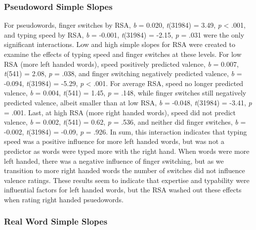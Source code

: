 \documentclass[english,man]{apa6}
\theoremstyle{definition}
\theoremstyle{definition}
\theoremstyle{definition}
\theoremstyle{remark}
\begin{document}
\subsubsection{Pseudoword Simple Slopes}\label{pseudoword-simple-slopes}

For pseudowords, finger switches by RSA, \emph{b} = 0.020,
\emph{t}(31984) = 3.49, \emph{p} \textless{} .001, and typing speed by
RSA, \emph{b} = -0.001, \emph{t}(31984) = -2.15, \emph{p} = .031 were
the only significant interactions. Low and high simple slopes for RSA
were created to examine the effects of typing speed and finger switches
at these levels. For low RSA (more left handed words), speed positively
predicted valence, \emph{b} = 0.007, \emph{t}(541) = 2.08, \emph{p} =
.038, and finger switching negatively predicted valence, \emph{b} =
-0.094, \emph{t}(31984) = -5.29, \emph{p} \textless{} .001. For average
RSA, speed no longer predicted valence, \emph{b} = 0.004, \emph{t}(541)
= 1.45, \emph{p} = .148, while finger switches still negatively
predicted valence, albeit smaller than at low RSA, \emph{b} = -0.048,
\emph{t}(31984) = -3.41, \emph{p} = .001. Last, at high RSA (more right
handed words), speed did not predict valence, \emph{b} = 0.002,
\emph{t}(541) = 0.62, \emph{p} = .536, and neither did finger switches,
\emph{b} = -0.002, \emph{t}(31984) = -0.09, \emph{p} = .926. In sum,
this interaction indicates that typing speed was a positive influence
for more left handed words, but was not a predictor as words were typed
more with the right hand. When words were more left handed, there was a
negative influence of finger switching, but as we transition to more
right handed words the number of switches did not influence valence
ratings. These results seem to indicate that expertise and typability
were influential factors for left handed words, but the RSA washed out
these effects when rating right handed psuedowords.

\subsubsection{Real Word Simple Slopes}\label{real-word-simple-slopes}
\end{document}
